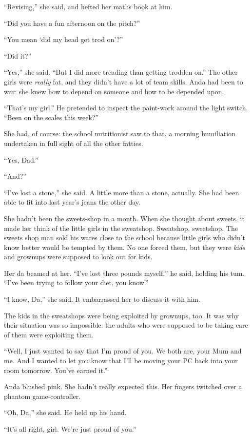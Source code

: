 “Revising,” she said, and hefted her maths book at him.

“Did you have a fun afternoon on the pitch?”

“You mean ‘did my head get trod on’?”

“Did it?”

“Yes,” she said. “But I did more treading than getting trodden on.”
The other girls were \emph{really} fat, and they didn’t have a lot
of team skills. Anda had been to war: she knew how to depend on
someone and how to be depended upon.

“That’s my girl.” He pretended to inspect the paint-work around the
light switch. “Been on the scales this week?”

She had, of course: the school nutritionist saw to that, a morning
humiliation undertaken in full sight of all the other fatties.

“Yes, Dad.”

“And\dash{}?”

“I’ve lost a stone,” she said. A little more than a stone,
actually. She had been able to fit into last year’s jeans the other
day.

She hadn’t been the sweets-shop in a month. When she thought about
sweets, it made her think of the little girls in the sweatshop.
Sweatshop, sweetshop. The sweets shop man sold his wares close to
the school because little girls who didn’t know better would be
tempted by them. No one forced them, but they were \emph{kids} and
grownups were supposed to look out for kids.

Her da beamed at her. “I’ve lost three pounds myself,” he said,
holding his tum. “I’ve been trying to follow your diet, you know.”

“I know, Da,” she said. It embarrassed her to discuss it with him.

The kids in the sweatshops were being exploited by grownups, too.
It was why their situation was so impossible: the adults who were
supposed to be taking care of them were exploiting them.

“Well, I just wanted to say that I’m proud of you. We both are,
your Mum and me. And I wanted to let you know that I’ll be moving
your PC back into your room tomorrow. You’ve earned it.”

Anda blushed pink. She hadn’t really expected this. Her fingers
twitched over a phantom game-controller.

“Oh, Da,” she said. He held up his hand.

“It’s all right, girl. We’re just proud of you.”

